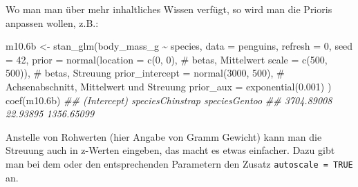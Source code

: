 \documentclass[
  a4paper,
  DIV=11]{scrreprt}
\newenvironment{Shaded}{\begin{snugshade}}{\end{snugshade}}
\newcommand{\AttributeTok}[1]{\textcolor[rgb]{0.40,0.45,0.13}{#1}}
\newcommand{\CommentTok}[1]{\textcolor[rgb]{0.37,0.37,0.37}{#1}}
\newcommand{\DecValTok}[1]{\textcolor[rgb]{0.68,0.00,0.00}{#1}}
\newcommand{\DocumentationTok}[1]{\textcolor[rgb]{0.37,0.37,0.37}{\textit{#1}}}
\newcommand{\FloatTok}[1]{\textcolor[rgb]{0.68,0.00,0.00}{#1}}
\newcommand{\FunctionTok}[1]{\textcolor[rgb]{0.28,0.35,0.67}{#1}}
\newcommand{\NormalTok}[1]{\textcolor[rgb]{0.00,0.23,0.31}{#1}}
\newcommand{\OtherTok}[1]{\textcolor[rgb]{0.00,0.23,0.31}{#1}}
\newcommand{\SpecialCharTok}[1]{\textcolor[rgb]{0.37,0.37,0.37}{#1}}
\theoremstyle{definition}
\theoremstyle{remark}
\begin{document}
Wo man man über mehr inhaltliches Wissen verfügt, so wird man die
Prioris anpassen wollen, z.B.:

\begin{Shaded}
\begin{Highlighting}[]
\NormalTok{m10}\FloatTok{.6}\NormalTok{b }\OtherTok{\textless{}{-}} \FunctionTok{stan\_glm}\NormalTok{(body\_mass\_g }\SpecialCharTok{\textasciitilde{}}\NormalTok{ species, }
                   \AttributeTok{data =}\NormalTok{ penguins, }
                   \AttributeTok{refresh =} \DecValTok{0}\NormalTok{,}
                   \AttributeTok{seed =} \DecValTok{42}\NormalTok{,}
                   \AttributeTok{prior =} \FunctionTok{normal}\NormalTok{(}\AttributeTok{location =} \FunctionTok{c}\NormalTok{(}\DecValTok{0}\NormalTok{, }\DecValTok{0}\NormalTok{),  }\CommentTok{\# betas, Mittelwert}
                                  \AttributeTok{scale =} \FunctionTok{c}\NormalTok{(}\DecValTok{500}\NormalTok{, }\DecValTok{500}\NormalTok{)),  }\CommentTok{\# betas, Streuung}
                   \AttributeTok{prior\_intercept =} \FunctionTok{normal}\NormalTok{(}\DecValTok{3000}\NormalTok{, }\DecValTok{500}\NormalTok{),  }\CommentTok{\# Achsenabschnitt, Mittelwert und Streuung}
                   \AttributeTok{prior\_aux =} \FunctionTok{exponential}\NormalTok{(}\FloatTok{0.001}\NormalTok{)}
\NormalTok{)}
\FunctionTok{coef}\NormalTok{(m10}\FloatTok{.6}\NormalTok{b)}
\DocumentationTok{\#\#      (Intercept) speciesChinstrap    speciesGentoo }
\DocumentationTok{\#\#       3704.89008         22.93895       1356.65099}
\end{Highlighting}
\end{Shaded}

Anstelle von Rohwerten (hier Angabe von Gramm Gewicht) kann man die
Streuung auch in z-Werten eingeben, das macht es etwas einfacher. Dazu
gibt man bei dem oder den entsprechenden Parametern den Zusatz
\texttt{autoscale\ =\ TRUE} an.
\end{document}
